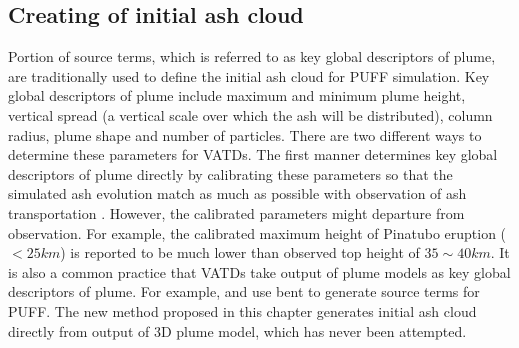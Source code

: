 \subsection{Creating of initial ash cloud}

Portion of source terms, which is referred to as key global descriptors of plume, are traditionally used to define the initial ash cloud for PUFF simulation. Key global descriptors of plume include maximum and minimum plume height, vertical spread (a vertical scale over which the ash will be distributed), column radius, plume shape and number of particles. There are two different ways to determine these parameters for VATDs. The first manner determines key global descriptors of plume directly by calibrating these parameters so that the simulated ash evolution match as much as possible with observation of ash transportation \citep[e.g.][]{fero2008simulation,fero2009simulating}. However, the calibrated parameters might departure from observation. For example, the calibrated maximum height of Pinatubo eruption ($<25 km$) is reported to be much lower \citep{fero2009simulating} than observed top height of $35 \sim 40 km$. It is also a common practice that VATDs take output of plume models as key global descriptors of plume. For example, \citet{bursik2012estimation} and \citet{ stefanescu2014temporal} use bent \citep{bursik2001effect} to generate source terms for PUFF. The new method proposed in this chapter generates initial ash cloud directly from output of 3D plume model, which has never been attempted.

